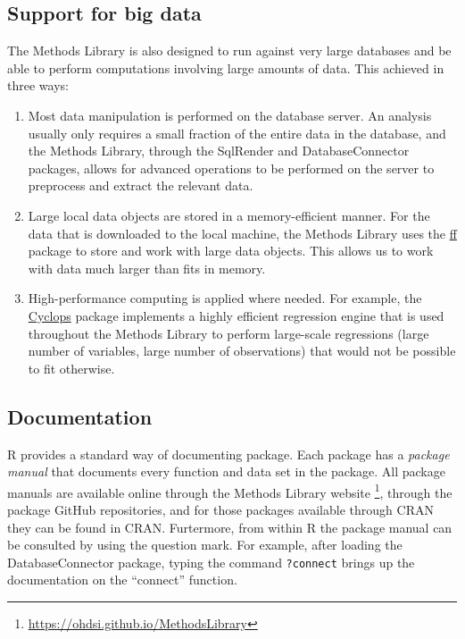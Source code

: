 \documentclass[11pt]{book}
\providecommand{\tightlist}{%
  \setlength{\itemsep}{0pt}\setlength{\parskip}{0pt}}
\let\rmarkdownfootnote\footnote%
\def\footnote{\protect\rmarkdownfootnote}
\theoremstyle{definition}
\theoremstyle{definition}
\theoremstyle{definition}
\theoremstyle{remark}
\begin{document}
\hypertarget{BigDataSupport}{%
\subsection{Support for big data}\label{BigDataSupport}}

The Methods Library is also designed to run against very large databases and be able to perform computations involving large amounts of data. This achieved in three ways:

\begin{enumerate}
\def\labelenumi{\arabic{enumi}.}
\tightlist
\item
  Most data manipulation is performed on the database server. An analysis usually only requires a small fraction of the entire data in the database, and the Methods Library, through the SqlRender and DatabaseConnector packages, allows for advanced operations to be performed on the server to preprocess and extract the relevant data.
\item
  Large local data objects are stored in a memory-efficient manner. For the data that is downloaded to the local machine, the Methods Library uses the \href{https://cran.r-project.org/web/packages/ff}{ff} package to store and work with large data objects. This allows us to work with data much larger than fits in memory.
\item
  High-performance computing is applied where needed. For example, the \href{https://ohdsi.github.io/Cyclops/}{Cyclops} package implements a highly efficient regression engine that is used throughout the Methods Library to perform large-scale regressions (large number of variables, large number of observations) that would not be possible to fit otherwise.
\end{enumerate}

\hypertarget{documentation-1}{%
\subsection{Documentation}\label{documentation-1}}

R provides a standard way of documenting package. Each package has a \emph{package manual} that documents every function and data set in the package. All package manuals are available online through the Methods Library website \footnote{\url{https://ohdsi.github.io/MethodsLibrary}}, through the package GitHub repositories, and for those packages available through CRAN they can be found in CRAN. Furtermore, from within R the package manual can be consulted by using the question mark. For example, after loading the DatabaseConnector package, typing the command \texttt{?connect} brings up the documentation on the ``connect'' function.
\end{document}
